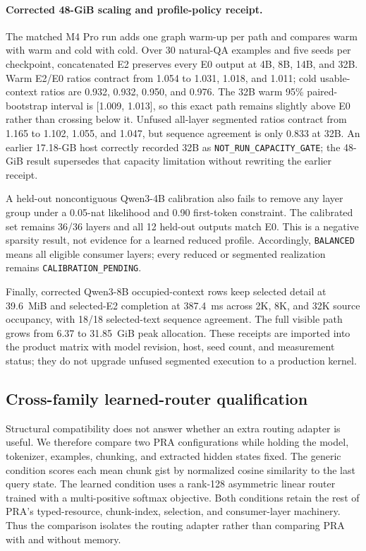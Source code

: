\documentclass[11pt]{article}
\begin{document}
\paragraph{Corrected 48-GiB scaling and profile-policy receipt.}
The matched M4 Pro run adds one graph warm-up per path and compares warm with
warm and cold with cold. Over 30 natural-QA examples and five seeds per
checkpoint, concatenated E2 preserves every E0 output at 4B, 8B, 14B, and 32B.
Warm E2/E0 ratios contract from 1.054 to 1.031, 1.018, and 1.011; cold usable-
context ratios are 0.932, 0.932, 0.950, and 0.976. The 32B warm 95\% paired-
bootstrap interval is [1.009, 1.013], so this exact path remains slightly above
E0 rather than crossing below it. Unfused all-layer segmented ratios contract
from 1.165 to 1.102, 1.055, and 1.047, but sequence agreement is only 0.833 at
32B. An earlier 17.18-GB host correctly recorded 32B as
\texttt{NOT\_RUN\_CAPACITY\_GATE}; the 48-GiB result supersedes that capacity
limitation without rewriting the earlier receipt.

A held-out noncontiguous Qwen3-4B calibration also fails to remove any layer
group under a 0.05-nat likelihood and 0.90 first-token constraint. The
calibrated set remains 36/36 layers and all 12 held-out outputs match E0.
This is a negative sparsity result, not evidence for a learned reduced
profile. Accordingly, \texttt{BALANCED} means all eligible consumer layers;
every reduced or segmented realization remains
\texttt{CALIBRATION\_PENDING}.

Finally, corrected Qwen3-8B occupied-context rows keep selected detail at
39.6~MiB and selected-E2 completion at 387.4~ms across 2K, 8K, and 32K source
occupancy, with 18/18 selected-text sequence agreement. The full visible path
grows from 6.37 to 31.85~GiB peak allocation. These receipts are imported into
the product matrix with model revision, host, seed count, and measurement
status; they do not upgrade unfused segmented execution to a production
kernel.

\subsection{Cross-family learned-router qualification}

Structural compatibility does not answer whether an extra routing adapter is
useful. We therefore compare two PRA configurations while holding the model,
tokenizer, examples, chunking, and extracted hidden states fixed. The generic
condition scores each mean chunk gist by normalized cosine similarity to the
last query state. The learned condition uses a rank-128 asymmetric linear
router trained with a multi-positive softmax objective. Both conditions retain
the rest of PRA's typed-resource, chunk-index, selection, and consumer-layer
machinery. Thus the comparison isolates the routing adapter rather than
comparing PRA with and without memory.
\end{document}
